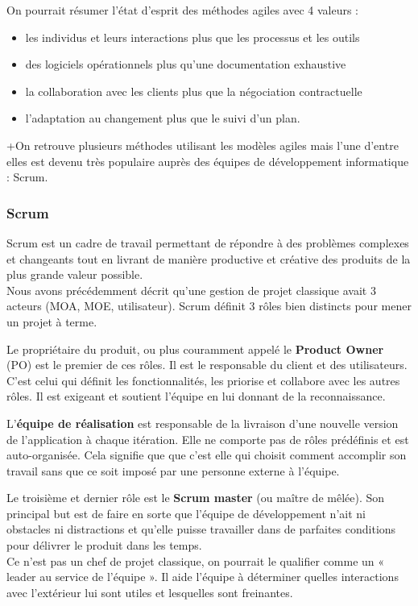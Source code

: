\documentclass[12pt]{report}
\begin{document}
On pourrait résumer l'état d'esprit des méthodes agiles avec 4 valeurs :
\begin{itemize}
\item les individus et leurs interactions plus que les processus et les outils
\item des logiciels opérationnels plus qu'une documentation exhaustive
\item la collaboration avec les clients plus que la négociation contractuelle
\item l'adaptation au changement plus que le suivi d'un plan\cite{gitagile}.
\end{itemize}
+On retrouve plusieurs méthodes utilisant les modèles agiles mais l'une d'entre elles est devenu très populaire auprès des équipes de développement informatique : Scrum.

\subsubsection{Scrum}

Scrum est un cadre de travail permettant de répondre à des problèmes complexes et changeants tout en livrant de manière productive et créative des produits de la plus grande valeur possible\cite{gitagile}.~~\\
Nous avons précédemment décrit qu'une gestion de projet classique avait 3 acteurs (MOA, MOE, utilisateur). Scrum définit 3 rôles bien distincts pour mener un projet à terme.

Le propriétaire du produit, ou plus couramment appelé le \textbf{Product Owner} (PO) est le premier de ces rôles. Il est le responsable du client et des utilisateurs. C'est celui qui définit les fonctionnalités, les priorise et collabore avec les autres rôles. Il est exigeant et soutient l'équipe en lui donnant de la reconnaissance\cite{wikienscrum}.

L'\textbf{équipe de réalisation} est responsable de la livraison d'une nouvelle version de l'application à chaque itération. Elle ne comporte pas de rôles prédéfinis et est auto-organisée. Cela signifie que que c'est elle qui choisit comment accomplir son travail sans que ce soit imposé par une personne externe à l'équipe.

Le troisième et dernier rôle est le \textbf{Scrum master} (ou maître de mêlée). Son principal but est de faire en sorte que l'équipe de développement n'ait ni obstacles ni distractions et qu'elle puisse travailler dans de parfaites conditions pour délivrer le produit dans les temps.~~\\
Ce n'est pas un chef de projet classique, on pourrait le qualifier comme un « leader au service de l'équipe ». Il aide l'équipe à déterminer quelles interactions avec l'extérieur lui sont utiles et lesquelles sont freinantes.
\end{document}
